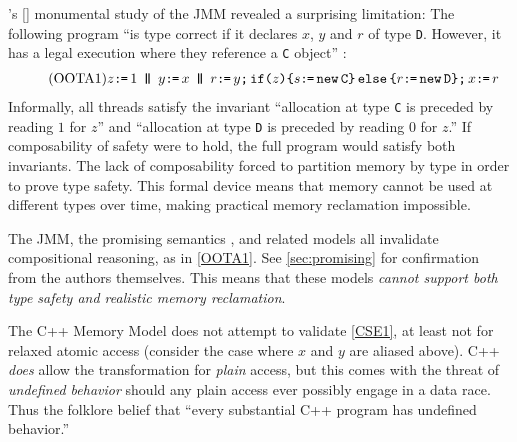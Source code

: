 \citeauthor{DBLP:journals/toplas/Lochbihler13}'s
[\citeyear{DBLP:journals/toplas/Lochbihler13}] monumental study of the JMM
revealed a surprising limitation: The following program ``is type correct if
it declares $x$, $y$ and $r$ of type \texttt{D}. However, it has a legal
execution where they reference a \texttt{C} object''
\citep[Fig.~8]{DBLP:journals/toplas/Lochbihler13}:
\begin{gather}
  \taglabel{OOTA1}
  z \GETS 1
  \PAR %
  y\GETS x
  \PAR
  \aReg\GETS y \SEMI \IF{z} \THEN \bReg \GETS \NEW \texttt{C} \ELSE \aReg \GETS \NEW \texttt{D} \FI  \SEMI x \GETS \aReg 
\end{gather}
Informally, all threads satisfy the invariant ``allocation at type \texttt{C}
is preceded by reading $1$ for $z$'' and ``allocation at type \texttt{D} is
preceded by reading $0$ for $z$.''  If composability of safety were to hold,
the full program would satisfy both invariants.  The lack of composability
forced \citeauthor{DBLP:journals/toplas/Lochbihler13} to partition memory by
type in order to prove type safety.  This formal device means that memory
cannot be used at different types over time, making practical memory
reclamation impossible.


The JMM, the promising semantics \cite{DBLP:conf/popl/KangHLVD17}, and
related models
\citep{DBLP:conf/esop/JagadeesanPR10,DBLP:journals/pacmpl/ChakrabortyV19} all
invalidate compositional reasoning, as in \ref{OOTA1}.  See
\textsection\ref{sec:promising} for confirmation from the authors themselves.
This means that these models \emph{cannot support both type safety and
  realistic memory reclamation}.


The C++ Memory Model \cite{Batty:2011:MCC:1926385.1926394} does not attempt
to validate \ref{CSE1}, at least not for relaxed atomic access (consider the
case where $x$ and $y$ are aliased above).  C++ \emph{does} allow the
transformation for \emph{plain} access, but this comes with the threat of
\emph{undefined behavior} should any plain access ever possibly engage in a
data race.  Thus the folklore belief that ``every substantial C++ program has
undefined behavior.''


